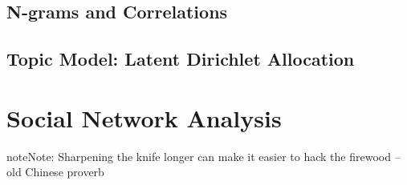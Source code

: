 \documentclass[letterpaper,11pt,english]{sphinxmanual}
\begin{document}
\section{N-grams and Correlations}
\label{textmining:n-grams-and-correlations}

\section{Topic Model: Latent Dirichlet Allocation}
\label{textmining:topic-model-latent-dirichlet-allocation}

\chapter{Social Network Analysis}
\label{socialnetwork:yassine-alouini}\label{socialnetwork:social-network-analysis}\label{socialnetwork::doc}\label{socialnetwork:socialnetwork}
\begin{notice}{note}{Note:}
Sharpening the knife longer can make it easier to hack the firewood -- old Chinese proverb
\end{notice}
\end{document}
